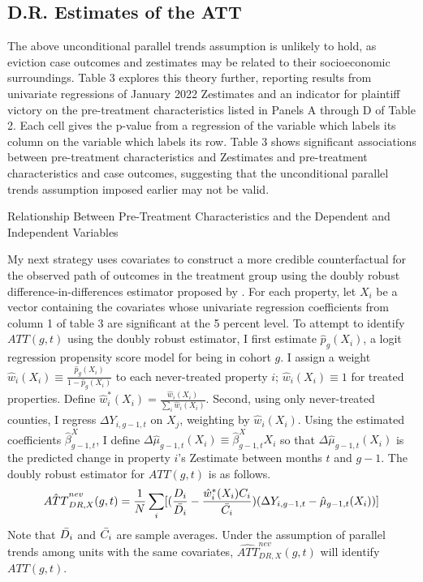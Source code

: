 \documentclass[12pt]{article}
\begin{document}
    \subsection{D.R. Estimates of the ATT}

    The above unconditional parallel trends assumption is unlikely to hold, as eviction case outcomes and zestimates may be related to their socioeconomic surroundings. Table 3 explores this theory further, reporting results from univariate regressions of January 2022 Zestimates and an indicator for plaintiff victory on the pre-treatment characteristics listed in Panels A through D of Table 2. Each cell gives the p-value from a regression of the variable which labels its column on the variable which labels its row. Table 3 shows significant associations between pre-treatment characteristics and Zestimates and pre-treatment characteristics and case outcomes, suggesting that the unconditional parallel trends assumption imposed earlier may not be valid.

    \begin{table}[H]
        \centering
        
        \caption{Relationship Between Pre-Treatment Characteristics and the Dependent and Independent Variables}
        \label{tab:my_label}
    \end{table}

    My next strategy uses covariates to construct a more credible counterfactual for the observed path of outcomes in the treatment group using the doubly robust difference-in-differences estimator proposed by \cite{santanna_doubly_2018}. For each property, let $X_i$ be a vector containing the covariates whose univariate regression coefficients from column 1 of table 3 are significant at the 5 percent level. To attempt to identify $ATT(g, t)$ using the doubly robust estimator, I first estimate $\hat{p}_g(X_i)$, a logit regression propensity score model for being in cohort $g$. I assign a weight $\hat{w}_i(X_i) \equiv\frac{\hat{p}_g(X_i)}{1 - \hat{p}_g(X_i)}$ to each never-treated property $i$; $\hat{w}_i(X_i) \equiv 1$ for treated properties. Define $\hat{w}^*_i(X_i) = \frac{\hat{w}_i(X_i)}{\sum_i \hat{w}_i(X_i)}$. Second, using only never-treated counties, I regress $\Delta Y_{i, g-1, t}$ on $X_j$, weighting by $\hat{w}_i(X_i)$. Using the estimated coefficients $\hat{\beta}_{g-1, t}^{X}$, I define $\Delta \hat{\mu}_{g-1, t}(X_i) \equiv \hat{\beta}_{g-1, t}^{X}X_i$ so that $\Delta \hat{\mu}_{g-1, t}(X_i)$ is the predicted change in property $i$'s Zestimate between months $t$ and $g-1$.
    The doubly robust estimator for $ATT(g, t)$ is as follows.
    \begin{align}
        \hat{ATT}^{nev}_{DR, X}(g,t) = \frac{1}{N}\sum_i[(\frac{D_i}{\Bar{D_i}} - \frac{\hat{w}^*_i(X_i)C_i}{\Bar{C_i}})(\Delta Y_{i, g-1, t} - \hat{\mu}_{g-1, t}(X_i))]
    \end{align}
    Note that $\Bar{D_i}$ and $\Bar{C_i}$ are sample averages. Under the assumption of parallel trends among units with the same covariates, $\hat{ATT}^{nev}_{DR, X}(g,t)$ will identify $ATT(g, t)$.
    
\end{document}
